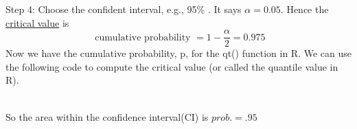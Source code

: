 \documentclass[12pt]{article}
\begin{document}
Step 4: Choose the confident interval, e.g., 95\% . It says 
$ \alpha = 0.05 $. Hence the {\underline {critical value}} is 
\begin{equation*}
\text{ cumulative probability } = 1 - \frac{\alpha}{2} = 0.975
\end{equation*}
Now we have the cumulative probability, p, for the qt() function in R.
We can use the following code to compute the critical value (or called
the quantile value in R).

\noindent{}\\

So the area within the confidence interval(CI) is $ prob. = .95 $

\begin{figure}[H]
\end{figure}
\end{document}
